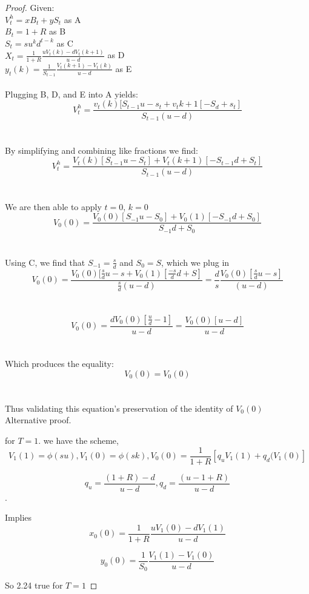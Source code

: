 \documentclass[]{book}
\theoremstyle{definition}
\begin{document}
\begin{enumerate}
\begin{proof}
Given:\\
$V_t^h=xB_t+yS_t$ as A\\
$B_t=1+R$ as B\\
$S_t=su^kd^{t-k}$ as C\\
$X_t=\frac{1}{1+R}\frac{uV_t(k)-dV_t(k+1)}{u-d}$ as D\\
$y_t(k)=\frac{1}{S_{t-1}}\frac{V_t(k+1)-V_t(k)}{u-d}$ as E\\
\\
Plugging B, D, and E into A yields:\\
$$V_t^h=\frac{v_t(k)[S_{t-1}u-s_t+v_t{k+1}[-S_d+s_t]}{S_{t-1}(u-d)}$$\\
\\
By simplifying and combining like fractions we find:\\
$$V_t^h=\frac{V_t(k)[S_{t-1}u-S_t]+V_t(k+1)[-S_{t-1}d+S_t]}{S_{t-1}(u-d)}$$\\
\\
We are then able to apply $t=0$, $k=0$\\
$$V_0(0)=\frac{V_0(0)[S_{-1}u-S_0]+V_0(1)[-S_{-1}d+S_0]}{S_{-1}d+S_0}$$\\
\\
Using C, we find that $S_{-1}=\frac{s}{d}$ and $S_0=S$, which we plug in\\
$$V_0(0)=\frac{V_0(0)[\frac{s}{d}u-s+V_0(1)[\frac{-s}{d}d+S]}{\frac{s}{d}(u-d)}=\frac{d}{s}\frac{V_0(0)[\frac{s}{d}u-s]}{(u-d)}$$\\
\\
$$V_0(0)=\frac{dV_0(0)[\frac{u}{d}-1]}{u-d}=\frac{V_0(0)[u-d]}{u-d}$$\\
\\
Which produces the equality:\\
$$V_0(0)=V_0(0)$$\\
\\
Thus validating this equation's preservation of the identity of $V_0(0)$\\



Alternative proof.

for $T=1$.
we have the scheme, $$V_1(1) = \phi(su), V_1(0) = \phi(sk), V_0(0) = \frac{1}{1+R}\left[q_uV_1(1)+q_d(V_1(0)\right]$$

$$q_u = \frac{(1+R)-d}{u-d}, q_d = \frac{(u- 1+R)}{u-d}$$.

Implies $$x_0(0)= \frac{1}{1+R}\frac{uV_1(0)-dV_1(1)}{u-d}$$

$$y_0(0)= \frac{1}{S_0}\frac{V_1(1)-V_1(0)}{u-d}$$

So 2.24 true for $T=1$


\end{proof}
\end{enumerate}
\end{document}
